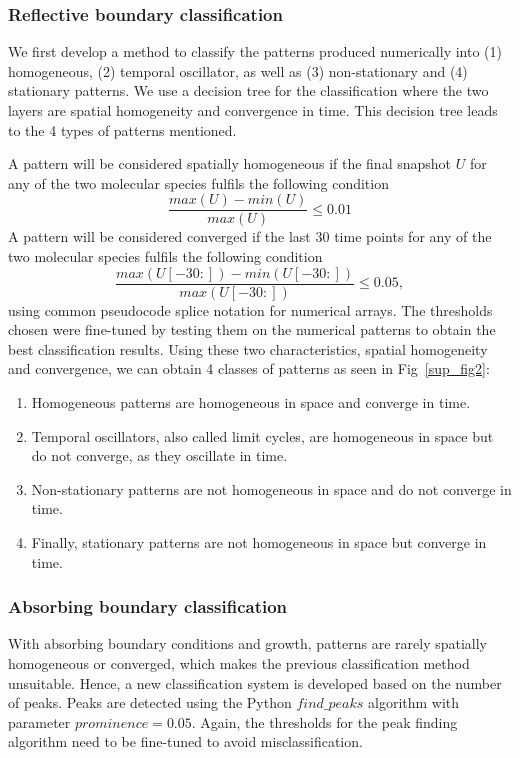 \subsubsection*{Reflective boundary classification}\label{numerical_classification1}
We first develop a method to classify the patterns produced numerically into (1) homogeneous, (2) temporal oscillator, as well as (3) non-stationary and (4) stationary patterns.
We use a decision tree for the classification where the two layers are spatial homogeneity and convergence in time.
This decision tree leads to the 4 types of patterns mentioned.

A pattern will be considered spatially homogeneous if the final snapshot $U$ for any of the two molecular species fulfils the following condition
\begin{equation}
    \frac{max(U) - min(U)}{max(U)} \leq 0.01
\end{equation}
A pattern will be considered converged if the last 30 time points for any of the two molecular species fulfils the following condition
\begin{equation}
    \frac{max(U[-30:]) - min(U[-30:])}{max(U[-30:])} \leq 0.05,
\end{equation}
using common pseudocode splice notation for numerical arrays. The thresholds chosen were fine-tuned by testing them on the numerical patterns to obtain the best classification results.
Using these two characteristics, spatial homogeneity and convergence, we can obtain 4 classes of patterns as seen in Fig~\ref{sup_fig2}:
\begin{enumerate}
    \item Homogeneous patterns are homogeneous in space and converge in time.
    \item Temporal oscillators, also called limit cycles, are homogeneous in space but do not converge, as they oscillate in time.
    \item Non-stationary patterns are not homogeneous in space and do not converge in time.
    \item Finally, stationary patterns are not homogeneous in space but converge in time.
\end{enumerate}
\subsubsection*{Absorbing boundary classification}\label{numerical_classification2}
With absorbing boundary conditions and growth, patterns are rarely spatially homogeneous or converged, which makes the previous classification method unsuitable. Hence, a new classification system is developed based on the number of peaks.
Peaks are detected using the Python $find\_peaks$ algorithm with parameter $prominence=0.05$.
Again, the thresholds for the peak finding algorithm need to be fine-tuned to avoid misclassification.

